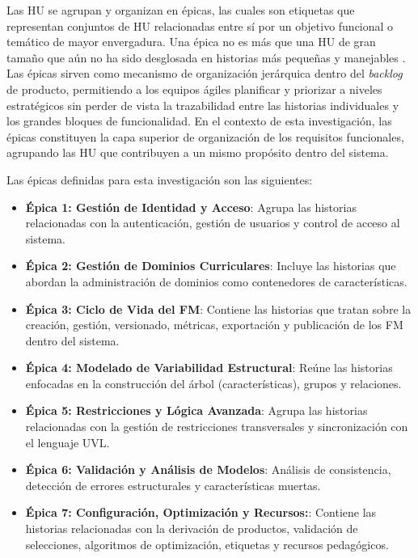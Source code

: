 Las \ac{HU} se agrupan y organizan en épicas, las cuales son etiquetas que representan conjuntos 
de \ac{HU} relacionadas entre sí por un objetivo funcional o temático de mayor envergadura. 
Una épica no es más que una \ac{HU} de gran tamaño que aún no ha sido desglosada en historias más pequeñas y 
manejables \citep{cohn2004user}. Las épicas sirven como mecanismo de organización jerárquica dentro del 
\textit{backlog} de producto, permitiendo a los equipos ágiles planificar y priorizar a niveles estratégicos 
sin perder de vista la trazabilidad entre las historias individuales y los grandes bloques de funcionalidad. 
En el contexto de esta investigación, las épicas constituyen la capa superior de organización de los requisitos 
funcionales, agrupando las \ac{HU} que contribuyen a un mismo propósito dentro del sistema.

Las épicas definidas para esta investigación son las siguientes:

\begin{itemize}
	\item \textbf{Épica 1: Gestión de Identidad y Acceso}: Agrupa las historias relacionadas con la autenticación, gestión de usuarios y control de acceso al sistema.
	\item \textbf{Épica 2: Gestión de Dominios Curriculares}: Incluye las historias que abordan la administración de dominios como contenedores de características.
	\item \textbf{Épica 3: Ciclo de Vida del \ac{FM}}: Contiene las historias que tratan sobre la creación, gestión, versionado, métricas, exportación y publicación de los \ac{FM} dentro del sistema.
	\item \textbf{Épica 4: Modelado de Variabilidad Estructural}: Reúne las historias enfocadas en la construcción del árbol (características), grupos y relaciones.
	\item \textbf{Épica 5: Restricciones y Lógica Avanzada}: Agrupa las historias relacionadas con la gestión de restricciones transversales y sincronización con el lenguaje \ac{UVL}.
	\item \textbf{Épica 6: Validación y Análisis de Modelos}: Análisis de consistencia, detección de errores estructurales y características muertas.
	\item \textbf{Épica 7: Configuración, Optimización y Recursos:}: Contiene las historias relacionadas con la derivación de productos, validación de selecciones, algoritmos de optimización, etiquetas y recursos pedagógicos.
\end{itemize}

